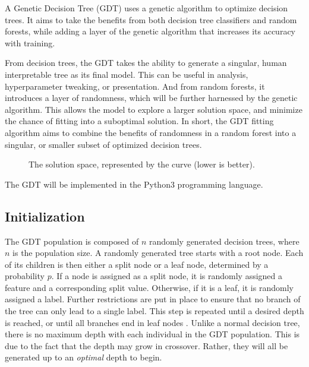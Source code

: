 \documentclass[12pt]{article}
\begin{document}
A Genetic Decision Tree (GDT) uses a genetic algorithm to optimize decision trees. It aims to take the benefits from both decision tree classifiers and random forests, while adding a layer of the genetic algorithm that increases its accuracy with training.

From decision trees, the GDT takes the ability to generate a singular, human interpretable tree as its final model. This can be useful in analysis, hyperparameter tweaking, or presentation. And from random forests, it introduces a layer of randomness, which will be further harnessed by the genetic algorithm. This allows the model to explore a larger solution space, and minimize the chance of fitting into a suboptimal solution. In short, the GDT fitting algorithm aims to combine the benefits of randomness in a random forest into a singular, or smaller subset of optimized decision trees.

\begin{figure}[H]
    \centering
    \caption{The solution space, represented by the curve (lower is better).}
    \label{fig:solutionspace}
\end{figure}

The GDT will be implemented in the Python3 programming language.

\subsection{Initialization}

The GDT population is composed of $n$ randomly generated decision trees, where $n$ is the population size. A randomly generated tree starts with a root node. Each of its children is then either a split node or a leaf node, determined by a probability $p$. If a node is assigned as a split node, it is randomly assigned a feature and a corresponding split value. Otherwise, if it is a leaf, it is randomly assigned a label. Further restrictions are put in place to ensure that no branch of the tree can only lead to a single label. This step is repeated until a desired depth is reached, or until all branches end in leaf nodes \cite{faik_2020}. Unlike a normal decision tree, there is no maximum depth with each individual in the GDT population. This is due to the fact that the depth may grow in crossover. Rather, they will all be generated up to an \textit{optimal} depth to begin.
\end{document}
